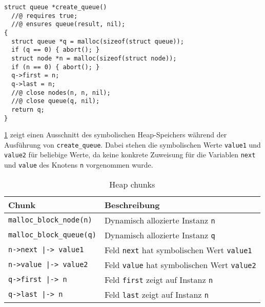 \begin{lstlisting}
struct queue *create_queue()
  //@ requires true;
  //@ ensures queue(result, nil);
{
  struct queue *q = malloc(sizeof(struct queue));
  if (q == 0) { abort(); }
  struct node *n = malloc(sizeof(struct node));
  if (n == 0) { abort(); }
  q->first = n;
  q->last = n;
  //@ close nodes(n, n, nil);
  //@ close queue(q, nil);
  return q;
}
\end{lstlisting}

\noindent
\cref{tab:heap-chunks} zeigt einen Ausschnitt des symbolischen Heap-Speichers während der Ausführung von \texttt{create\_queue}. Dabei stehen die symbolischen Werte \texttt{value1} und \texttt{value2} für beliebige Werte, da keine konkrete Zuweisung für die Variablen \texttt{next} und \texttt{value} des Knotens \texttt{n} vorgenommen wurde.

{\setlength\extrarowheight{5pt} %
\begin{table}[hbt!]
	\begin{tabularx}{\textwidth}{|p{4.5cm}|X|}
		\hline
		\rowcolor{LightGrey1}
		\textbf{Chunk}                   & \textbf{Beschreibung}                                     \\ \hline
		\texttt{malloc\_block\_node(n)}  & Dynamisch allozierte Instanz \texttt{n}                   \\ \hline
		\texttt{malloc\_block\_queue(q)} & Dynamisch allozierte Instanz \texttt{q}                   \\ \hline
		\texttt{n->next |-> value1}      & Feld \texttt{next} hat symbolischen Wert \texttt{value1}  \\ \hline
		\texttt{n->value |-> value2}     & Feld \texttt{value} hat symbolischen Wert \texttt{value2} \\ \hline
		\texttt{q->first |-> n}          & Feld \texttt{first} zeigt auf Instanz \texttt{n}          \\ \hline
		\texttt{q->last |-> n}           & Feld \texttt{last} zeigt auf Instanz \texttt{n}           \\ \hline
	\end{tabularx}
	\caption{Heap chunks}
	\label{tab:heap-chunks}
\end{table}
}

